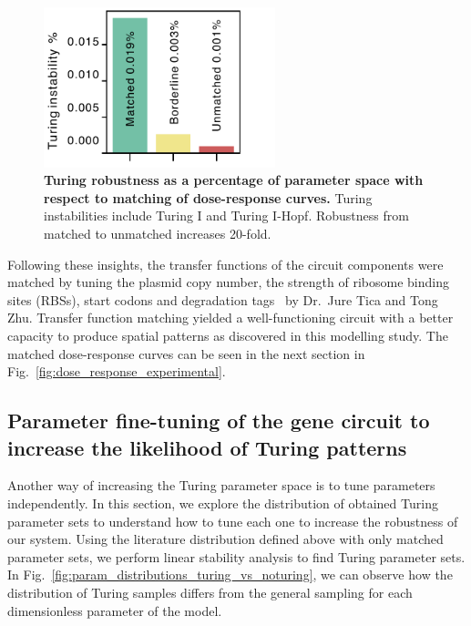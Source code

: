 \begin{figure}[H]
    \centering
    \includegraphics[width=0.6\textwidth]{chapters/Chapter 2/balancing_robustness}
    \caption{\textbf{Turing robustness as a percentage of parameter space with respect to matching of dose-response curves.} Turing instabilities include Turing I and Turing I-Hopf. Robustness from matched to unmatched increases 20-fold.}
    \label{fig:balancing_robustness}
\end{figure}

Following these insights, the transfer functions of the circuit components were matched by tuning the plasmid copy number,
the strength of ribosome binding sites (RBSs),
start codons and degradation tags~\parencite{Andersen1998, Wang2011,Hecht2017} by Dr.~Jure Tica and Tong Zhu.
Transfer function matching yielded a well-functioning circuit with a better capacity to produce spatial patterns
as discovered in this modelling study.
The matched dose-response curves can be seen in the next section in Fig.~\ref{fig:dose_response_experimental}.


\subsection{Parameter fine-tuning of the gene circuit to increase the likelihood of Turing patterns}
Another way of increasing the Turing parameter space is to tune parameters independently.
In this section, we explore the distribution of obtained Turing parameter sets
to understand how to tune each one to increase the robustness of our system.
Using the literature distribution defined above with only matched
parameter sets, we perform linear stability analysis to find Turing parameter sets.
In Fig.~\ref{fig:param_distributions_turing_vs_noturing},
we can observe how the distribution of Turing samples differs from the general sampling for each dimensionless parameter of the model.

